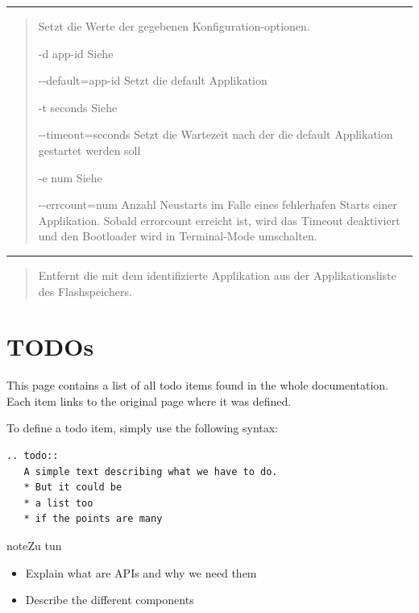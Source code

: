 \documentclass[letterpaper,10pt,ngerman]{manual}
\begin{document}
\bigskip\hrule{}\bigskip


\begin{quote}

Setzt die Werte der gegebenen Konfiguration-optionen.
\begin{optionlist}{3cm}
\item [-d app-id]  
Siehe 
\item [-{-}default=app-id]  
Setzt die default Applikation
\item [-t seconds]  
Siehe 
\item [-{-}timeout=seconds]  
Setzt die Wartezeit nach der die default Applikation gestartet werden soll
\item [-e num]  
Siehe 
\item [-{-}errcount=num]  
Anzahl Neustarts im Falle eines fehlerhafen Starts einer Applikation.  Sobald errorcount erreicht ist, wird das Timeout deaktiviert und den Bootloader wird in Terminal-Mode umschalten.
\end{optionlist}
\end{quote}


\bigskip\hrule{}\bigskip


\begin{quote}

Entfernt die mit dem  identifizierte Applikation aus der Applikationsliste des Flashspeichers.
\end{quote}

\resetcurrentobjects
\hypertarget{--doc-todos}{}

\chapter{TODOs}

This page contains a list of all todo items found in the whole documentation.
Each item links to the original page where it was defined.

To define a todo item, simply use the following syntax:

\begin{Verbatim}[commandchars=@\[\]]
.. todo::
   A simple text describing what we have to do.
   * But it could be
   * a list too
   * if the points are many
\end{Verbatim}

\begin{notice}{note}{Zu tun}
\begin{itemize}
\item {} 
Explain what are APIs and why we need them

\item {} 
Describe the different components

\end{itemize}
\end{notice}
\end{document}
